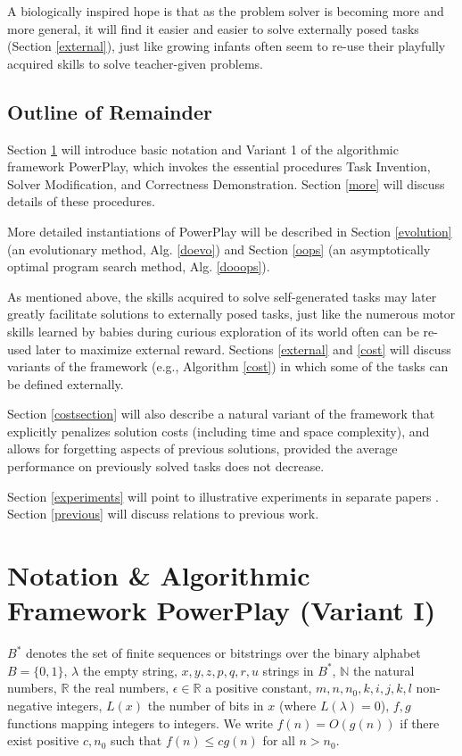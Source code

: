 \documentclass{article}
\begin{document}
A biologically inspired hope is that as the problem solver is becoming more and more general,
it will find it easier and easier to solve externally posed tasks (Section \ref{external}), just like
growing infants often seem to  re-use their playfully acquired skills to solve 
teacher-given problems.

\subsection{Outline of Remainder}

Section  \ref{framework} will introduce basic notation and Variant 1 of the algorithmic framework
{\sc PowerPlay}, which invokes the essential 
procedures {\sc Task Invention},  {\sc Solver Modification}, and {\sc Correctness Demonstration}.
Section  \ref{more} will discuss details of these procedures.

More detailed instantiations of {\sc PowerPlay} will be described in 
Section \ref{evolution} (an evolutionary method, Alg. \ref{doevo}) and 
Section \ref{oops} (an asymptotically optimal program search method, Alg.  \ref{dooops}).

As mentioned above, the skills acquired to solve
self-generated tasks may later greatly facilitate solutions to externally posed tasks, 
just like the numerous motor skills learned by babies during curious exploration of its world often
can be re-used later to maximize external reward.
Sections \ref{external} and \ref{cost} will discuss variants of the framework (e.g., Algorithm \ref{cost})  in which some
of the tasks can be defined externally. 

Section  \ref{costsection}  will also describe
a natural variant of the framework that explicitly penalizes solution costs (including time and space complexity),
and  allows for forgetting aspects of previous solutions, provided the average performance on
previously solved tasks does not decrease.

Section \ref{experiments} will point to illustrative experiments
in separate papers \cite{rupesh2012icdl,powerplay2012experiments}.
Section \ref{previous} will discuss relations to previous work.


\section{Notation \& Algorithmic Framework {\sc PowerPlay} (Variant I)}
\label{framework}

$B^*$ denotes the set of finite
sequences or bitstrings over the binary alphabet $B=\{0,1\}$, 
 $\lambda$ the empty string,
 $x,y,z,p,q,r,u$  strings in $B^*$,
 $\mathbb{N}$ the natural numbers,
 $\mathbb{R}$ the real numbers,
 $\epsilon \in \mathbb{R}$ a positive constant,
  $m, n,n_0,k,i,j,k,l$ non-negative integers,
$L(x)$ the number of bits in $x$ (where  $L(\lambda) = 0$),
$f,g$
functions mapping integers to integers.  We write $f(n)=O(g(n))$ if
there exist positive $c,n_0$ such that $f(n) \leq cg(n)$ for
all $n > n_0$.  
\end{document}
